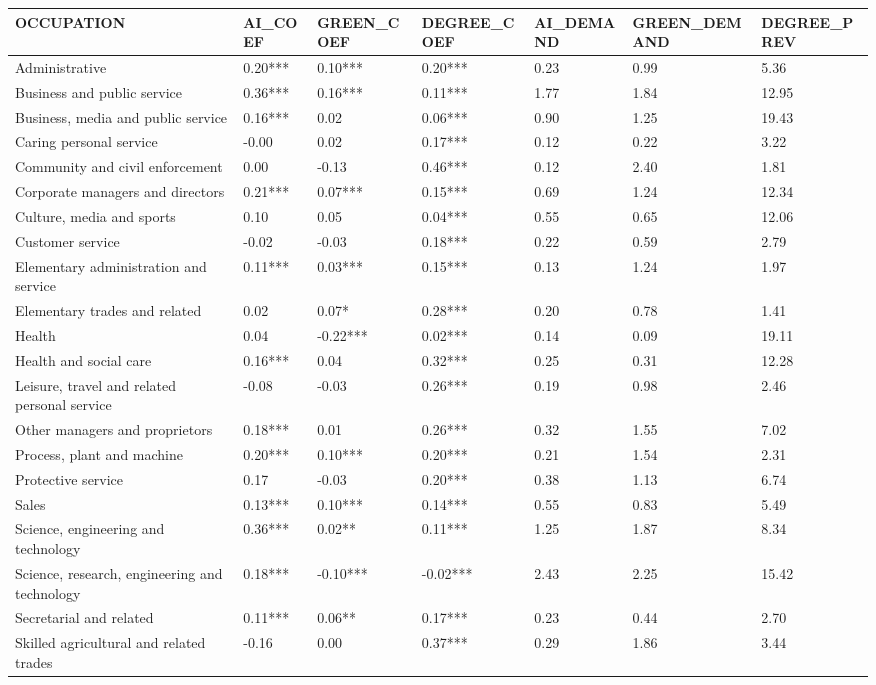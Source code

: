\begin{tabular}{lllllll}
\toprule
OCCUPATION & AI_COEF & GREEN_COEF & DEGREE_COEF & AI_DEMAND & GREEN_DEMAND & DEGREE_PREV \\
\midrule
Administrative & 0.20*** & 0.10*** & 0.20*** & 0.23 & 0.99 & 5.36 \\
Business and public service & 0.36*** & 0.16*** & 0.11*** & 1.77 & 1.84 & 12.95 \\
Business, media and public service & 0.16*** & 0.02 & 0.06*** & 0.90 & 1.25 & 19.43 \\
Caring personal service & -0.00 & 0.02 & 0.17*** & 0.12 & 0.22 & 3.22 \\
Community and civil enforcement & 0.00 & -0.13 & 0.46*** & 0.12 & 2.40 & 1.81 \\
Corporate managers and directors & 0.21*** & 0.07*** & 0.15*** & 0.69 & 1.24 & 12.34 \\
Culture, media and sports & 0.10 & 0.05 & 0.04*** & 0.55 & 0.65 & 12.06 \\
Customer service & -0.02 & -0.03 & 0.18*** & 0.22 & 0.59 & 2.79 \\
Elementary administration and service & 0.11*** & 0.03*** & 0.15*** & 0.13 & 1.24 & 1.97 \\
Elementary trades and related & 0.02 & 0.07* & 0.28*** & 0.20 & 0.78 & 1.41 \\
Health & 0.04 & -0.22*** & 0.02*** & 0.14 & 0.09 & 19.11 \\
Health and social care & 0.16*** & 0.04 & 0.32*** & 0.25 & 0.31 & 12.28 \\
Leisure, travel and related personal service & -0.08 & -0.03 & 0.26*** & 0.19 & 0.98 & 2.46 \\
Other managers and proprietors & 0.18*** & 0.01 & 0.26*** & 0.32 & 1.55 & 7.02 \\
Process, plant and machine & 0.20*** & 0.10*** & 0.20*** & 0.21 & 1.54 & 2.31 \\
Protective service & 0.17 & -0.03 & 0.20*** & 0.38 & 1.13 & 6.74 \\
Sales & 0.13*** & 0.10*** & 0.14*** & 0.55 & 0.83 & 5.49 \\
Science, engineering and technology & 0.36*** & 0.02** & 0.11*** & 1.25 & 1.87 & 8.34 \\
Science, research, engineering and technology & 0.18*** & -0.10*** & -0.02*** & 2.43 & 2.25 & 15.42 \\
Secretarial and related & 0.11*** & 0.06** & 0.17*** & 0.23 & 0.44 & 2.70 \\
Skilled agricultural and related trades & -0.16 & 0.00 & 0.37*** & 0.29 & 1.86 & 3.44 \\

\end{tabular}
